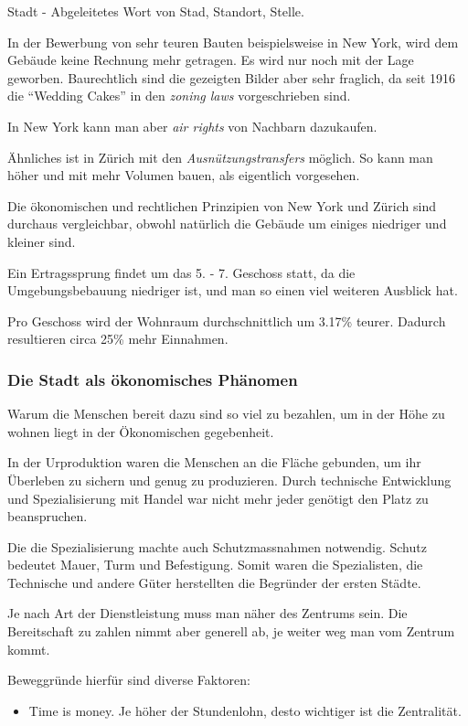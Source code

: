 \documentclass[11pt]{article}
\begin{document}
Stadt - Abgeleitetes Wort von Stad, Standort, Stelle.

In der Bewerbung von sehr teuren Bauten beispielsweise in New York, wird dem
Gebäude keine Rechnung mehr getragen. Es wird nur noch mit der Lage
geworben. Baurechtlich sind die gezeigten Bilder aber sehr fraglich, da seit
1916 die ``Wedding Cakes'' in den \emph{zoning laws} vorgeschrieben sind.

In New York kann man aber \emph{air rights} von Nachbarn dazukaufen.

Ähnliches ist in Zürich mit den \emph{Ausnützungstransfers} möglich. So kann man
höher und mit mehr Volumen bauen, als eigentlich vorgesehen.

Die ökonomischen und rechtlichen Prinzipien von New York und Zürich sind
durchaus vergleichbar, obwohl natürlich die Gebäude um einiges niedriger und
kleiner sind.

Ein Ertragssprung findet um das 5. - 7. Geschoss statt, da die
Umgebungsbebauung niedriger ist, und man so einen viel weiteren Ausblick
hat.

Pro Geschoss wird der Wohnraum durchschnittlich um 3.17\% teurer. Dadurch
resultieren circa 25\% mehr Einnahmen.

\subsubsection{Die Stadt als ökonomisches Phänomen}
\label{sec-2-2-2}

Warum die Menschen bereit dazu sind so viel zu bezahlen, um in der Höhe zu
wohnen liegt in der Ökonomischen gegebenheit.

In der Urproduktion waren die Menschen an die Fläche gebunden, um ihr
Überleben zu sichern und genug zu produzieren. Durch technische Entwicklung
und Spezialisierung mit Handel war nicht mehr jeder genötigt den Platz zu
beanspruchen.

Die die Spezialisierung machte auch Schutzmassnahmen notwendig. Schutz
bedeutet Mauer, Turm und Befestigung. Somit waren die Spezialisten, die
Technische und andere Güter herstellten die Begründer der ersten Städte.

Je nach Art der Dienstleistung muss man näher des Zentrums sein. Die
Bereitschaft zu zahlen nimmt aber generell ab, je weiter weg man vom Zentrum
kommt.

Beweggründe hierfür sind diverse Faktoren:

\begin{itemize}
\item Time is money. Je höher der Stundenlohn, desto wichtiger ist die Zentralität.
\end{itemize}
\end{document}
